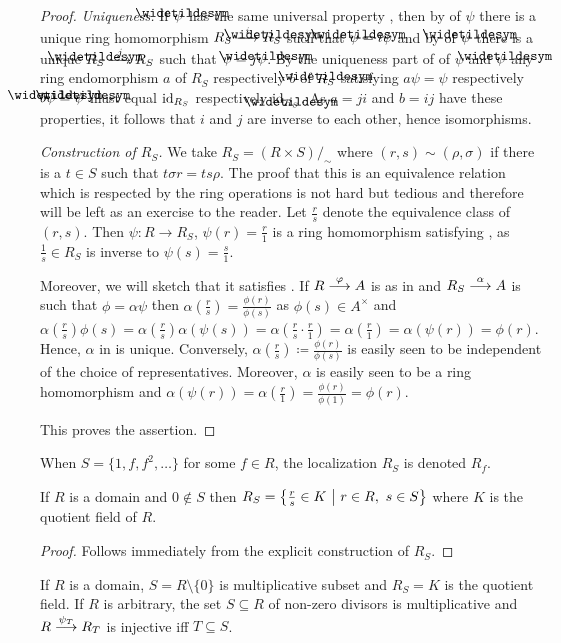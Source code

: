 \documentclass[a4paper,parskip=half,numbers=enddot, DIV=12]{scrreprt}
\begin{document}
	\begin{proof}
	\emph{Uniqueness.} 
		If $\snake \psi$ has the same universal property , then by  of $\psi$ there is a unique ring homomorphism $R_S \morphism[i] \snake R_S$ such that $\snake\psi = i\psi$ and by  of $\snake \psi$ there is a unique $\snake R_S\morphism[j] R_S$ such that $\psi = j\snake\psi$. By the uniqueness part of  of $\psi$ and $\snake \psi$ any ring endomorphism $a$ of $R_S$ respectively $b$ of $\snake R_S$ satisfying $a\psi = \psi$ respectively $b\snake\psi = \snake\psi$ must equal $\operatorname{id}_{R_S}$ respectively $\id_{\snake R_S}$. As $a=ji$ and $b=ij$ have these properties, it follows that $i$ and $j$ are inverse to each other, hence isomorphisms.
		
	\emph{Construction of $R_S$.}
		We take $R_S = (R\times S)/_\sim$ where $(r,s) \sim (\rho,\sigma)$ if there is a $t\in S$ such that $t\sigma r = ts\rho$. The proof that this is an equivalence relation which is respected by the ring operations is not hard but tedious and therefore will be left as an exercise to the reader. Let $\frac{r}{s}$ denote the equivalence class of $(r,s)$. Then $\psi\colon R\to R_S$, $\psi(r) = \frac{r}{1}$ is a ring homomorphism satisfying , as $\frac{1}{s}\in R_S$ is inverse to $\psi(s) = \frac{s}{1}$. 
		
		Moreover, we will sketch that it satisfies . If $R\morphism[\phi] A$ is as in  and $R_S\morphism[\alpha] A$ is such that $\phi = \alpha \psi$ then $\alpha\left(\frac{r}{s}\right) = \frac{\phi(r)}{\phi(s)}$ as $\phi(s)\in A^\times$ and $\alpha\left(\frac rs\right) \phi(s) = \alpha\left(\frac{r}{s}\right) \alpha(\psi(s)) = \alpha\left(\frac{r}{s}\cdot\frac{r}{1}\right) = \alpha\left(\frac{r}{1}\right) = \alpha(\psi(r)) = \phi(r)$. Hence, $\alpha$ in  is unique. Conversely, $\alpha\left(\frac{r}{s}\right)\coloneqq \frac{\phi(r)}{\phi(s)}$ is easily seen to be independent of the choice of representatives. Moreover, $\alpha$ is easily seen to be a ring homomorphism and $\alpha(\psi(r)) = \alpha\left(\frac{r}{1}\right) = \frac{\phi(r)}{\phi(1)} = \phi(r)$.
		
		This proves the assertion.
	\end{proof}
	\begin{rem*}
		When $S=\{1,f,f^2,\ldots\}$ for some $f\in R$, the localization $R_S$ is denoted $R_f$.
	\end{rem*}
	\begin{fact}
		If $R$ is a domain and $0\not\in S$ then $R_S=\left\{\frac{r}{s}\in K\st r\in R,\ s\in S\right\}$ where $K$ is the quotient field of $R$.
	\end{fact}
	\begin{proof}
		Follows immediately from the explicit construction of $R_S$.
	\end{proof}
	\begin{example}
		If $R$ is a domain, $S=R\setminus\{0\}$ is multiplicative subset and $R_S = K$ is the quotient field. If $R$ is arbitrary, the set $S\subseteq R$ of non-zero divisors is multiplicative and $R\morphism[\psi_T] R_T$ is injective iff $T\subseteq S$.
	\end{example}
	
\end{document}
